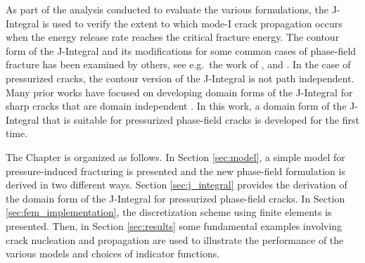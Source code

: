 As part of the analysis conducted to evaluate the various formulations, the J-Integral is used to verify the extent to which mode-I crack propagation occurs when the energy release rate reaches the critical fracture energy.  
The contour form of the J-Integral and its modifications for some common cases of phase-field fracture has been examined by others, see e.g.\ the work of \cite{sicsic2013gradient}, \cite{ballarini2016closed} and \cite{hossain2014effective}.  In the case of pressurized cracks, the contour version of the J-Integral is not path independent. Many prior works have focused on developing domain forms of the J-Integral for sharp cracks that are domain independent \cite{li1985comparison, shih1986energy}.  In this work, a domain form of the J-Integral that is suitable for pressurized phase-field cracks is developed for the first time.  

The Chapter is organized as follows. In Section \ref{sec:model}, a simple model for pressure-induced fracturing is presented and the new phase-field formulation is derived in two different ways.  Section \ref{sec:j_integral} provides the derivation of the domain form of the J-Integral for pressurized phase-field cracks. In Section \ref{sec:fem_implementation}, the discretization scheme using finite elements is presented. Then, in Section \ref{sec:results} some fundamental examples involving crack nucleation and propagation are used to illustrate the performance of the various models and choices of indicator functions. 
